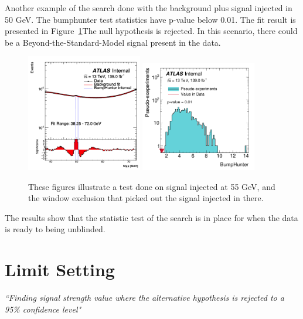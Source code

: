 Another example of the search done with the background plus signal injected in 50 GeV. The bumphunter test statistics have p-value below 0.01. The fit result is presented in Figure~\ref{fig:searchbump}The null hypothesis is rejected. In this scenario, there could be a Beyond-the-Standard-Model signal present in the data.

\begin{figure}[!htb]
    \begin{center}
        \includegraphics[width=0.45\textwidth]{figures/chapter_dimuon/SearchBump}
        \includegraphics[width=0.45\textwidth]{figures/chapter_dimuon/bumpHunterStatPlot_bump}
        \caption{
        These figures illustrate a test done on signal injected at 55 GeV, and the window exclusion that picked out the signal injected in there.}
        \label{fig:searchbump}
    \end{center}
\end{figure}
\FloatBarrier

The results show that the statistic test of the search is in place for when the data is ready to being unblinded.

\section{Limit Setting}

\textit{``Finding signal strength value where the alternative hypothesis is rejected to a 95\% confidence level"}


